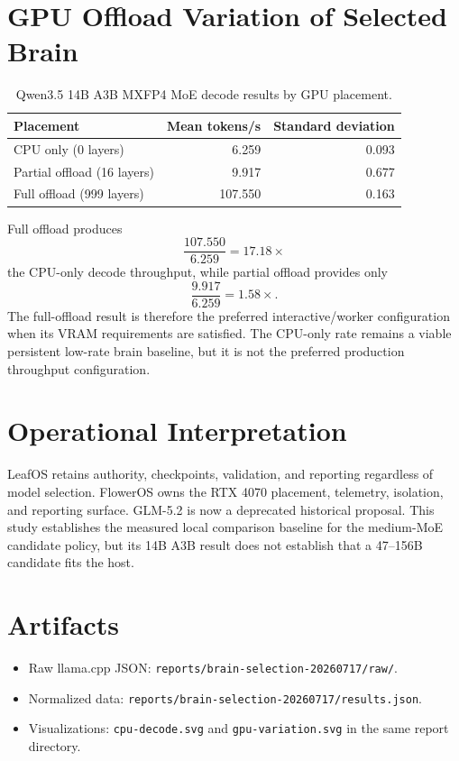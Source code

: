 \documentclass[11pt]{article}
\begin{document}
\section{GPU Offload Variation of Selected Brain}
\begin{table}[h]
\centering
\caption{Qwen3.5 14B A3B MXFP4 MoE decode results by GPU placement.}
\begin{tabular}{lrr}
\toprule
Placement & Mean tokens/s & Standard deviation \\
\midrule
CPU only (0 layers) & 6.259 & 0.093 \\
Partial offload (16 layers) & 9.917 & 0.677 \\
Full offload (999 layers) & 107.550 & 0.163 \\
\bottomrule
\end{tabular}
\end{table}
Full offload produces
\[
\frac{107.550}{6.259}=17.18\times
\]
the CPU-only decode throughput, while partial offload provides only
\[
\frac{9.917}{6.259}=1.58\times.
\]
The full-offload result is therefore the preferred interactive/worker configuration when its VRAM requirements are satisfied. The CPU-only rate remains a viable persistent low-rate brain baseline, but it is not the preferred production throughput configuration.
\section{Operational Interpretation}
LeafOS retains authority, checkpoints, validation, and reporting regardless of model selection. FlowerOS owns the RTX 4070 placement, telemetry, isolation, and reporting surface. GLM-5.2 is now a deprecated historical proposal. This study establishes the measured local comparison baseline for the medium-MoE candidate policy, but its 14B A3B result does not establish that a 47--156B candidate fits the host.
\section{Artifacts}
\begin{itemize}
\item Raw llama.cpp JSON: \texttt{reports/brain-selection-20260717/raw/}.
\item Normalized data: \texttt{reports/brain-selection-20260717/results.json}.
\item Visualizations: \texttt{cpu-decode.svg} and \texttt{gpu-variation.svg} in the same report directory.
\end{itemize}
\end{document}

